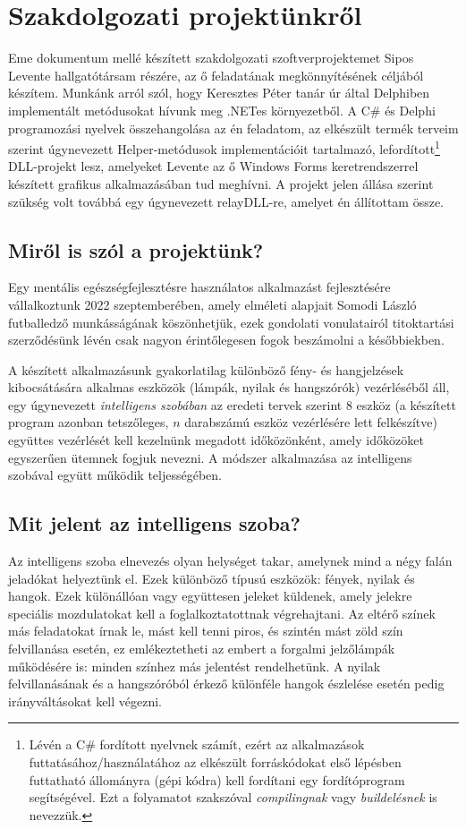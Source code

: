 \documentclass[tocnopagenum]{thesis-ekf}
\theoremstyle{definition}
\theoremstyle{remark}
\begin{document}
	\chapter{Szakdolgozati projektünkről}
	Eme dokumentum mellé készített szakdolgozati szoftverprojektemet Sipos Levente hallgatótársam részére, az ő feladatának megkönnyítésének céljából készítem. 
	Munkánk arról szól, hogy Keresztes Péter tanár úr által Delphiben implementált metódusokat hívunk meg .NETes környezetből. A C\# és Delphi programozási nyelvek összehangolása az én feladatom, az elkészült termék terveim szerint úgynevezett Helper-metódusok implementációit tartalmazó, lefordított\footnote{Lévén a C\# fordított nyelvnek számít, ezért az alkalmazások futtatásához/használatához az elkészült forráskódokat első lépésben futtatható állományra (gépi kódra) kell fordítani egy fordítóprogram segítségével. Ezt a folyamatot szakszóval \textit{compilingnak} vagy \textit{buildelésnek} is nevezzük.} DLL-projekt lesz, amelyeket Levente az ő Windows Forms keretrendszerrel készített grafikus alkalmazásában tud meghívni. A projekt jelen állása szerint szükség volt továbbá egy úgynevezett relayDLL-re, amelyet én állítottam össze.

	\section{Miről is szól a projektünk?}
	Egy mentális egészségfejlesztésre használatos alkalmazást fejlesztésére vállalkoztunk 2022 szeptemberében, amely elméleti alapjait Somodi László futballedző munkásságának köszönhetjük, ezek gondolati vonulatairól titoktartási szerződésünk lévén csak nagyon érintőlegesen fogok beszámolni a későbbiekben. 
	
	A készített alkalmazásunk gyakorlatilag különböző fény- és hangjelzések kibocsátására alkalmas eszközök (lámpák, nyilak és hangszórók) vezérléséből áll, egy úgynevezett \emph{intelligens szobában} az eredeti tervek szerint 8 eszköz (a készített program azonban tetszőleges, $n$ darabszámú eszköz vezérlésére lett felkészítve) együttes vezérlését kell kezelnünk megadott időközönként, amely időközöket egyszerűen ütemnek fogjuk nevezni.
	A módszer alkalmazása az intelligens szobával együtt működik teljességében.
	
	\section{Mit jelent az intelligens szoba?}
	Az intelligens szoba elnevezés olyan helységet takar, amelynek mind a négy falán jeladókat helyeztünk el.
	Ezek különböző típusú eszközök: fények, nyilak és hangok. 
	Ezek különállóan vagy együttesen jeleket küldenek, amely jelekre speciális mozdulatokat kell a foglalkoztatottnak végrehajtani.
	Az eltérő színek más feladatokat írnak le, mást kell tenni piros, és szintén mást zöld szín felvillanása esetén, ez emlékeztetheti az embert a forgalmi jelzőlámpák működésére is: minden színhez más jelentést rendelhetünk. A nyilak felvillanásának és a hangszóróból érkező különféle hangok észlelése esetén pedig irányváltásokat kell végezni.
	
\end{document}
